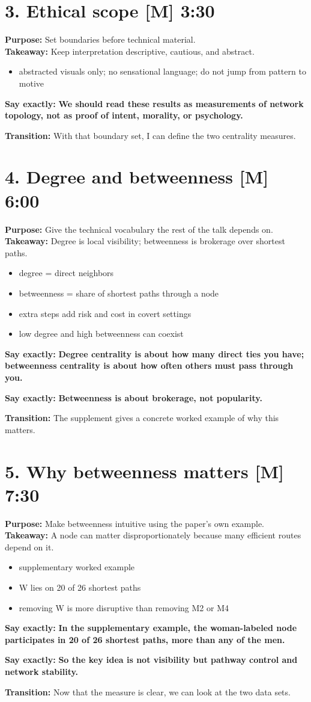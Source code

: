 \documentclass[11pt,a4paper]{article}
\newcommand{\slide}[4]{%
\section*{#1 \hfill {\normalsize #2}}
\textbf{Purpose:} #3\\
\textbf{Takeaway:} #4
}
\newcommand{\boldline}[1]{\par\textbf{Say exactly:} \textbf{#1}}
\newcommand{\transition}[1]{\par\textbf{Transition:} #1}
\newcommand{\labelbox}[1]{\textbf{[#1]}}
\begin{document}
\slide{3. Ethical scope \labelbox{M}}{3:30}{Set boundaries before technical material.}{Keep interpretation descriptive, cautious, and abstract.}
\begin{itemize}
\item abstracted visuals only; no sensational language; do not jump from pattern to motive
\end{itemize}
\boldline{We should read these results as measurements of network topology, not as proof of intent, morality, or psychology.}
\transition{With that boundary set, I can define the two centrality measures.}

\slide{4. Degree and betweenness \labelbox{M}}{6:00}{Give the technical vocabulary the rest of the talk depends on.}{Degree is local visibility; betweenness is brokerage over shortest paths.}
\begin{itemize}
\item degree = direct neighbors
\item betweenness = share of shortest paths through a node
\item extra steps add risk and cost in covert settings
\item low degree and high betweenness can coexist
\end{itemize}
\boldline{Degree centrality is about how many direct ties you have; betweenness centrality is about how often others must pass through you.}
\boldline{Betweenness is about brokerage, not popularity.}
\transition{The supplement gives a concrete worked example of why this matters.}

\slide{5. Why betweenness matters \labelbox{M}}{7:30}{Make betweenness intuitive using the paper’s own example.}{A node can matter disproportionately because many efficient routes depend on it.}
\begin{itemize}
\item supplementary worked example
\item W lies on 20 of 26 shortest paths
\item removing W is more disruptive than removing M2 or M4
\end{itemize}
\boldline{In the supplementary example, the woman-labeled node participates in 20 of 26 shortest paths, more than any of the men.}
\boldline{So the key idea is not visibility but pathway control and network stability.}
\transition{Now that the measure is clear, we can look at the two data sets.}
\end{document}
